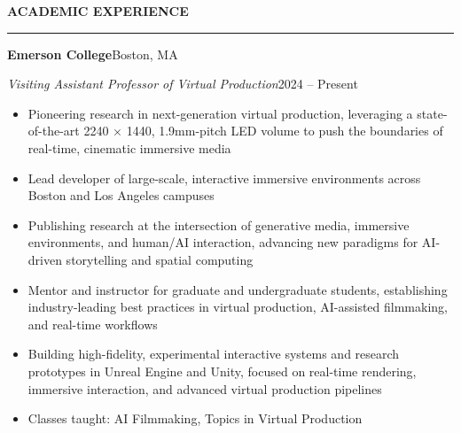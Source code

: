 \documentclass[10pt,letterpaper]{article}
\newcommand{\cvsection}[1]{%
  \par\addvspace{7pt}%
  {\large\bfseries\MakeUppercase{#1}}\par\nobreak
  \vspace{-0.55\baselineskip}\rule{\linewidth}{0.6pt}\par\nobreak\vspace{1.5pt}}
\newcommand{\entry}[4]{%
  \par\addvspace{2.5pt}%
  {\large\bfseries #1}\hfill #2\par\nobreak
  \textit{#3}\hfill #4\par\nobreak}
\newenvironment{bullets}{%
  \begin{itemize}[leftmargin=0.95em,labelsep=0.35em,itemsep=0pt,parsep=0pt,topsep=1pt,partopsep=0pt,
    label={\raisebox{0.25ex}{\tiny$\bullet$}}]}{\end{itemize}}
\begin{document}
\cvsection{Academic Experience}
\entry{Emerson College}{Boston, MA}{Visiting Assistant Professor of Virtual Production}{2024 -- Present}
\begin{bullets}
\item Pioneering research in next-generation virtual production, leveraging a state-of-the-art 2240 $\times$ 1440, 1.9mm-pitch LED volume to push the boundaries of real-time, cinematic immersive media
\item Lead developer of large-scale, interactive immersive environments across Boston and Los Angeles campuses
\item Publishing research at the intersection of generative media, immersive environments, and human/AI interaction, advancing new paradigms for AI-driven storytelling and spatial computing
\item Mentor and instructor for graduate and undergraduate students, establishing industry-leading best practices in virtual production, AI-assisted filmmaking, and real-time workflows
\item Building high-fidelity, experimental interactive systems and research prototypes in Unreal Engine and Unity, focused on real-time rendering, immersive interaction, and advanced virtual production pipelines
\item Classes taught: AI Filmmaking, Topics in Virtual Production
\end{bullets}
\end{document}
